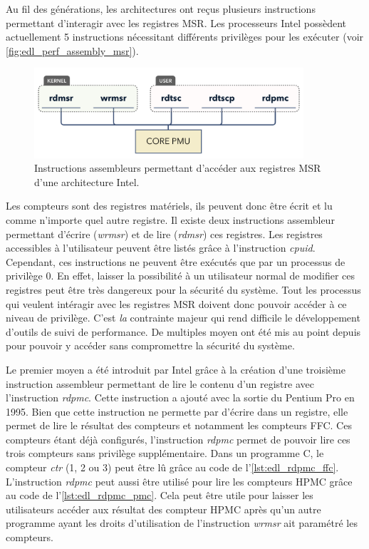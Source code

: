         Au fil des générations, les architectures ont reçus plusieurs instructions permettant d'interagir avec les registres MSR. Les processeurs Intel possèdent actuellement 5 instructions nécessitant différents privilèges pour les exécuter (voir \autoref{fig:edl_perf_assembly_msr}).
        
        \begin{figure}[h!]
            \center
            \includegraphics[width=10cm]{images/edl_perf_assembly_msr.png}
            \caption{\label{fig:edl_perf_assembly_msr} Instructions assembleurs permettant d'accéder aux registres MSR d'une architecture Intel.}
        \end{figure}
    
    
        Les compteurs sont des registres matériels, ils peuvent donc être écrit et lu comme n'importe quel autre registre. Il existe deux instructions assembleur permettant d'écrire (\textit{wrmsr}) et de lire (\textit{rdmsr}) ces registres. Les registres accessibles à l'utilisateur peuvent être listés grâce à l'instruction \textit{cpuid}. Cependant, ces instructions ne peuvent être exécutés que par un processus de privilège 0. En effet, laisser la possibilité à un utilisateur normal de modifier ces registres peut être très dangereux pour la sécurité du système. Tout les processus qui veulent intéragir avec les registres MSR doivent donc pouvoir accéder à ce niveau de privilège. C'est \textit{la} contrainte majeur qui rend difficile le développement d'outils de suivi de performance. De multiples moyen ont été mis au point depuis pour pouvoir y accéder sans compromettre la sécurité du système. 
        
        Le premier moyen a été introduit par Intel grâce à la création d'une troisième instruction assembleur permettant de lire le contenu d'un registre avec l'instruction \textit{rdpmc}. Cette instruction a ajouté avec la sortie du Pentium Pro en 1995. Bien que cette instruction ne permette par d'écrire dans un registre, elle permet de lire le résultat des compteurs et notamment les compteurs FFC. Ces compteurs étant déjà configurés, l'instruction \textit{rdpmc} permet de pouvoir lire ces trois compteurs sans privilège supplémentaire. Dans un programme C, le compteur \textit{ctr} (1, 2 ou 3) peut être lû grâce au code de l'\autoref{lst:edl_rdpmc_ffc}. L'instruction \textit{rdpmc} peut aussi être utilisé pour lire les compteurs HPMC grâce au code de l'\autoref{lst:edl_rdpmc_pmc}. Cela peut être utile pour laisser les utilisateurs accéder aux résultat des compteur HPMC après qu'un autre programme ayant les droits d'utilisation de l'instruction \textit{wrmsr} ait paramétré les compteurs.
    
